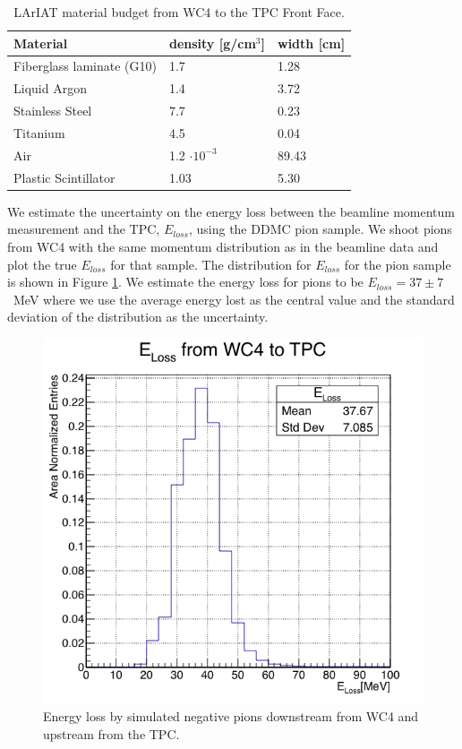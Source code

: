 \begin{table}[h!]
\centering
\begin{tabular}{|l|l|l|}
\hline
Material  & density {[}g/cm$^3${]} & width {[}cm{]}    \\ \hline
Fiberglass laminate (G10)      & 1.7                             & 1.28                              \\
Liquid Argon                           & 1.4                             & 3.72                             \\
Stainless Steel                        & 7.7                            & 0.23                             \\
Titanium                                  & 4.5                            & 0.04                             \\ 
Air                                            &  1.2 $\cdot10^{-3}$  & 89.43                              \\
Plastic Scintillator                    & 1.03                          & 5.30                              \\ \hline
\end{tabular}
\caption{LArIAT material budget from WC4 to the TPC Front Face.}
\label{tab:budget}
\end{table}


We estimate the uncertainty on the energy loss between the beamline momentum measurement and the TPC, $E_{loss}$, using the DDMC pion sample. We shoot pions from WC4 with the same momentum distribution as in the beamline data and plot the true $E_{loss}$ for that sample. The distribution for $E_{loss}$ for the pion sample is shown in Figure \ref{fig:Eloss}. We estimate the energy loss for pions to be $E_{loss} = 37 \pm 7 $~MeV where we use the average energy lost as the central value and the standard deviation of the distribution as the uncertainty. 

\begin{figure}[hpbt]
\centering
\includegraphics[scale=0.4]{Chapter-5/Images/cELossPions.png}
\caption{Energy loss by simulated negative pions downstream from WC4 and upstream from the TPC.}
\label{fig:Eloss}
\end{figure}






